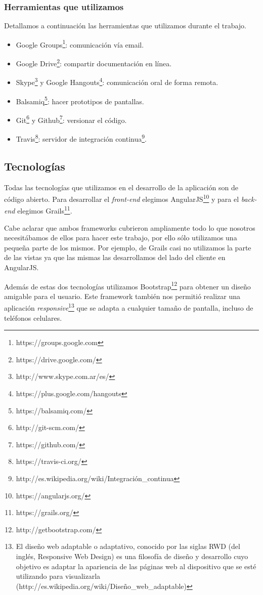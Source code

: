 \subsubsection{Herramientas que utilizamos}
Detallamos a continuación las herramientas que utilizamos durante el trabajo.
\begin{itemize}
\item Google Groups\footnote{https://groups.google.com}: comunicación vía email.
\item Google Drive\footnote{https://drive.google.com/}: compartir documentación en línea.
\item Skype\footnote{http://www.skype.com.ar/es/} y Google Hangouts\footnote{https://plus.google.com/hangouts}: comunicación oral de forma remota.
\item Balsamiq\footnote{https://balsamiq.com/}: hacer prototipos de pantallas.
\item Git\footnote{http://git-scm.com/} y Github\footnote{https://github.com/}: versionar el código.
\item Travis\footnote{https://travis-ci.org/}: servidor de integración continua\footnote{http://es.wikipedia.org/wiki/Integración\_continua}.
\end{itemize}

\subsection{Tecnologías}
Todas las tecnologías que utilizamos en el desarrollo de la aplicación son de código abierto. Para desarrollar el \textit{front-end} elegimos AngularJS\footnote{https://angularjs.org/} y para el \textit{back-end} elegimos Grails\footnote{https://grails.org/}.

Cabe aclarar que ambos frameworks cubrieron ampliamente todo lo que nosotros necesitábamos de ellos para hacer este trabajo, por ello sólo utilizamos una pequeña parte de los mismos. Por ejemplo, de Grails casi no utilizamos la parte de las vistas ya que las mismas las desarrollamos del lado del cliente en AngularJS.

Además de estas dos tecnologías utilizamos Bootstrap\footnote{http://getbootstrap.com/} para obtener un diseño amigable para el usuario. Este framework también nos permitió realizar una aplicación \textit{responsive}\footnote{El diseño web adaptable o adaptativo, conocido por las siglas RWD (del inglés, Responsive Web Design) es una filosofía de diseño y desarrollo cuyo objetivo es adaptar la apariencia de las páginas web al dispositivo que se esté utilizando para visualizarla (http://es.wikipedia.org/wiki/Diseño\_web\_adaptable)} que se adapta a cualquier tamaño de pantalla, incluso de teléfonos celulares.

